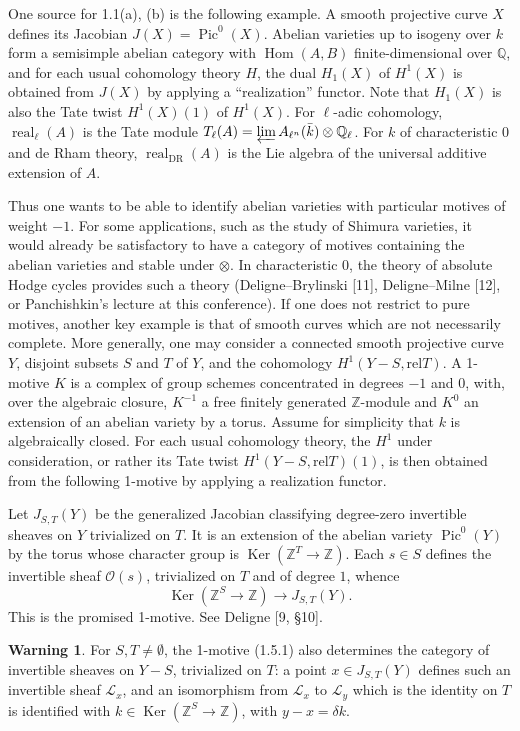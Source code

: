 \documentclass[11pt,a4paper]{article}
\theoremstyle{plain}
\theoremstyle{definition}
\newtheorem{remark}[theorem]{Warning}
\DeclareMathOperator{\Hom}{Hom}
\DeclareMathOperator{\Ker}{Ker}
\DeclareMathOperator{\Pic}{Pic}
\newcommand{\Q}{\mathbb{Q}}
\newcommand{\Z}{\mathbb{Z}}
\newcommand{\Qell}{\mathbb{Q}_\ell}
\DeclareMathOperator{\real}{real}
\DeclareMathOperator{\DR}{DR}
\newcommand{\rel}{\mathrm{rel}}
\begin{document}
One source for 1.1(a), (b) is the following example. A smooth projective curve $X$ defines its Jacobian $J(X)=\Pic^0(X)$. Abelian varieties up to isogeny over $k$ form a semisimple abelian category with $\Hom(A,B)$ finite-dimensional over $\Q$, and for each usual cohomology theory $H$, the dual $H_1(X)$ of $H^1(X)$ is obtained from $J(X)$ by applying a ``realization'' functor. Note that $H_1(X)$ is also the Tate twist $H^1(X)(1)$ of $H^1(X)$. For $\ell$-adic cohomology, $\real_\ell(A)$ is the Tate module $T_\ell(A)=\varprojlim A_{\ell^n}(\bar{k})\otimes\Qell$. For $k$ of characteristic $0$ and de Rham theory, $\real_{\DR}(A)$ is the Lie algebra of the universal additive extension of $A$.

Thus one wants to be able to identify abelian varieties with particular motives of weight $-1$. For some applications, such as the study of Shimura varieties, it would already be satisfactory to have a category of motives containing the abelian varieties and stable under $\otimes$. In characteristic $0$, the theory of absolute Hodge cycles provides such a theory (Deligne--Brylinski [11], Deligne--Milne [12], or Panchishkin's lecture at this conference). If one does not restrict to pure motives, another key example is that of smooth curves which are not necessarily complete. More generally, one may consider a connected smooth projective curve $Y$, disjoint subsets $S$ and $T$ of $Y$, and the cohomology $H^1(Y-S,\rel T)$. A 1-motive $K$ is a complex of group schemes concentrated in degrees $-1$ and $0$, with, over the algebraic closure, $K^{-1}$ a free finitely generated $\Z$-module and $K^0$ an extension of an abelian variety by a torus. Assume for simplicity that $k$ is algebraically closed. For each usual cohomology theory, the $H^1$ under consideration, or rather its Tate twist $H^1(Y-S,\rel T)(1)$, is then obtained from the following 1-motive by applying a realization functor.

Let $J_{S,T}(Y)$ be the generalized Jacobian classifying degree-zero invertible sheaves on $Y$ trivialized on $T$. It is an extension of the abelian variety $\Pic^0(Y)$ by the torus whose character group is $\Ker(\Z^T\to\Z)$. Each $s\in S$ defines the invertible sheaf $\mathcal{O}(s)$, trivialized on $T$ and of degree $1$, whence
\begin{equation}
\Ker(\Z^S\to\Z)\to J_{S,T}(Y).
\tag{1.5.1}
\end{equation}
This is the promised 1-motive. See Deligne [9, \S10].

\begin{remark}
For $S,T\neq\emptyset$, the 1-motive (1.5.1) also determines the category of invertible sheaves on $Y-S$, trivialized on $T$: a point $x\in J_{S,T}(Y)$ defines such an invertible sheaf $\mathcal{L}_x$, and an isomorphism from $\mathcal{L}_x$ to $\mathcal{L}_y$ which is the identity on $T$ is identified with $k\in\Ker(\Z^S\to\Z)$, with $y-x=\delta k$.
\end{remark}
\end{document}

